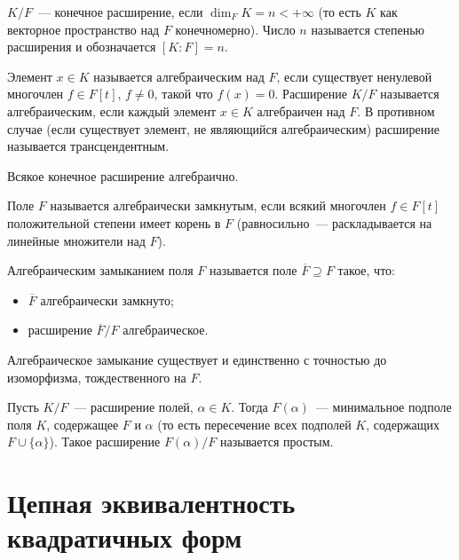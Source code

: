 \documentclass[12pt]{article}
\begin{document}
	\begin{definition}
		$K / F$~--- конечное расширение, если $\dim_F K = n < +\infty$ (то есть $K$ как векторное пространство над $F$ конечномерно). Число $n$ называется степенью расширения и обозначается $[K : F] = n$.
	\end{definition}
	
	\begin{definition}
		Элемент $x \in K$ называется алгебраическим над $F$, если существует ненулевой многочлен $f \in F[t]$, $f \neq 0$, такой что $f(x) = 0$. Расширение $K / F$ называется алгебраическим, если каждый элемент $x \in K$ алгебраичен над $F$. В противном случае (если существует элемент, не являющийся алгебраическим) расширение называется трансцендентным.
	\end{definition}
	
	\begin{statement}
		Всякое конечное расширение алгебраично.
	\end{statement}
	
	\begin{definition}
		Поле $F$ называется алгебраически замкнутым, если всякий многочлен $f \in F[t]$ положительной степени имеет корень в $F$ (равносильно~--- раскладывается на линейные множители над $F$).
		
		Алгебраическим замыканием поля $F$ называется поле $\overline{F} \supseteq F$ такое, что:
		\begin{itemize}
			\item $\overline{F}$ алгебраически замкнуто;
			\item расширение $\overline{F} / F$ алгебраическое.
		\end{itemize}
		
		Алгебраическое замыкание существует и единственно с точностью до изоморфизма, тождественного на $F$.
	\end{definition}
	
	\begin{definition}
		Пусть $K / F$~--- расширение полей, $\alpha \in K$. Тогда $F(\alpha)$~--- минимальное подполе поля $K$, содержащее $F$ и $\alpha$ (то есть пересечение всех подполей $K$, содержащих $F \cup \{ \alpha \}$). Такое расширение $F(\alpha) / F$ называется простым.
	\end{definition}
	
	\section{Цепная эквивалентность квадратичных форм}
	
\end{document}
